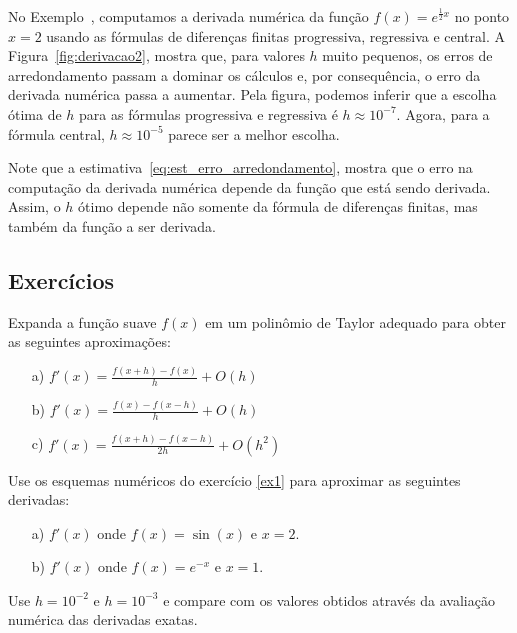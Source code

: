 \begin{ex}
No Exemplo~\label{ex:derivacao2}, computamos a derivada numérica da função $f(x)=e^{\frac{1}{2}x}$ no ponto $x=2$ usando as fórmulas de diferenças finitas progressiva, regressiva e central. A Figura~\ref{fig:derivacao2}, mostra que, para valores $h$ muito pequenos, os erros de arredondamento passam a dominar os cálculos e, por consequência, o erro da derivada numérica passa a aumentar. Pela figura, podemos inferir que a escolha ótima de $h$ para as fórmulas progressiva e regressiva é $h\approx 10^{-7}$. Agora, para a fórmula central, $h\approx 10^{-5}$ parece ser a melhor escolha.
\end{ex}

\begin{obs}
  Note que a estimativa~\eqref{eq:est_erro_arredondamento}, mostra que o erro na computação da derivada numérica depende da função que está sendo derivada. Assim, o $h$ ótimo depende não somente da fórmula de diferenças finitas, mas também da função a ser derivada.
\end{obs}

\subsection{Exercícios}

\begin{Exercise}\label{ex1} Expanda a função suave $f(x)$ em um polinômio de Taylor adequado para obter as seguintes aproximações:
\begin{itemize}
\item[a)] $f'(x)=\frac{f(x+h)-f(x)}{h}+O(h)$
\item[b)] $f'(x)=\frac{f(x)-f(x-h)}{h}+O(h)$
\item[c)] $f'(x)=\frac{f(x+h)-f(x-h)}{2h}+O(h^2)$
\end{itemize}
\end{Exercise}

\begin{Exercise}
Use os esquemas numéricos do exercício \ref{ex1} para aproximar as seguintes derivadas:
\begin{itemize}
\item[a)] $f'(x)$ onde $f(x)=\sin(x)$ e $x=2$.
\item[b)] $f'(x)$ onde $f(x)=e^{-x}$ e $x=1$.
\end{itemize}

Use $h=10^{-2}$ e $h=10^{-3}$ e compare com os valores obtidos através da avaliação numérica das derivadas exatas.
\end{Exercise}

